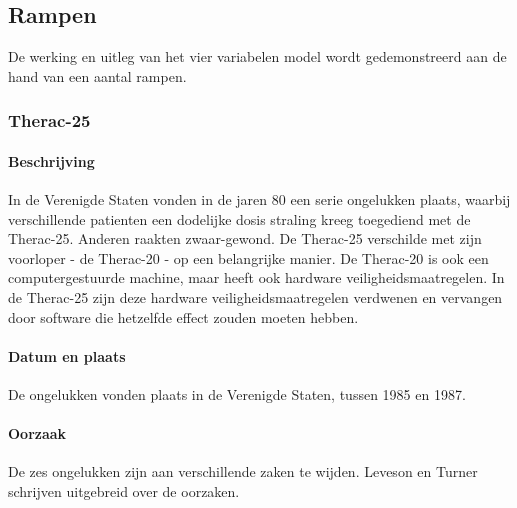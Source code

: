 \documentclass{article}
\begin{document}
		\subsection{Rampen}
		
		De werking en uitleg van het vier variabelen model wordt gedemonstreerd aan de hand van een aantal rampen. \par
		
			\subsubsection{Therac-25}

				\paragraph{Beschrijving}

				In de Verenigde Staten vonden in de jaren 80 een serie ongelukken plaats, waarbij verschillende patienten een dodelijke dosis straling kreeg toegediend met de Therac-25. Anderen raakten zwaar-gewond. De Therac-25 verschilde met zijn voorloper - de Therac-20 - op een belangrijke manier. De Therac-20 is ook een computergestuurde machine, maar heeft ook hardware veiligheidsmaatregelen. In de Therac-25 zijn deze hardware veiligheidsmaatregelen verdwenen en vervangen door software die hetzelfde effect zouden moeten hebben. \cite{thomas1994story} \par

				\paragraph{Datum en plaats}

				De ongelukken vonden plaats in de Verenigde Staten, tussen 1985 en 1987. \par

				\paragraph{Oorzaak}

				De zes ongelukken zijn aan verschillende zaken te wijden. Leveson en Turner schrijven uitgebreid over de oorzaken. \cite{274940} \par
\end{document}
